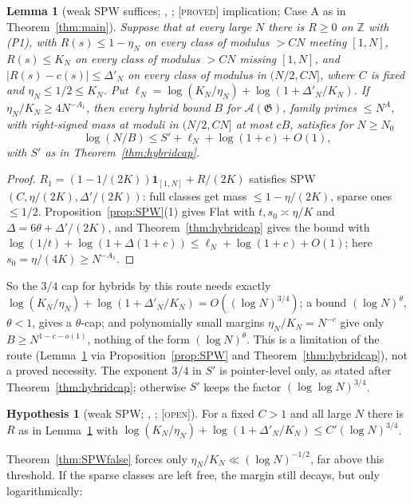 \documentclass[10pt,reqno]{amsart}
\newtheorem{lemma}[theorem]{Lemma}
\theoremstyle{definition}
\newtheorem{hypothesis}[theorem]{Hypothesis}
\theoremstyle{remark}
\newcommand{\A}{\mathcal A}
\newcommand{\cG}{\mathfrak G}
\newcommand{\Z}{\mathbb Z}
\newcommand{\ind}{\mathbf 1}
\newcommand{\lab}[1]{\textup{[\textsc{#1}]}}
\begin{document}
\begin{lemma}[weak SPW suffices; {\cite[Lemma~1.4]{SPW}}, {\cite[Lemma~1.1]{SPW2}}; \lab{proved} implication; Case A as in Theorem~\ref{thm:main}]\label{lem:weakSPW}
Suppose that at every large $N$ there is $R\geq0$ on $\Z$ with (P1), with
$R(s)\leq1-\eta_N$ on every class of modulus $>CN$ meeting $[1,N]$, $R(s)\leq K_N$ on
every class of modulus $>CN$ missing $[1,N]$, and $|R(s)-c(s)|\leq\Delta'_N$ on every
class of modulus in $(N/2,CN]$, where $C$ is fixed and $\eta_N\leq1/2\leq K_N$.  Put
$\ell_N=\log(K_N/\eta_N)+\log(1+\Delta'_N/K_N)$.  If $\eta_N/K_N\geq4N^{-A_1}$, then every
hybrid bound $B$ for $\A(\cG)$, family primes $\leq N^A$, with right-signed mass at
moduli in $(N/2,CN]$ at most $cB$, satisfies for $N\geq N_0$
\[
 \log(N/B)\leq S'+\ell_N+\log(1+c)+O(1),
\]
with $S'$ as in Theorem~\ref{thm:hybridcap}.
\end{lemma}
\begin{proof}
$R_1=(1-1/(2K))\ind_{[1,N]}+R/(2K)$ satisfies SPW$(C,\eta/(2K),\Delta'/(2K))$: full
classes get mass $\leq1-\eta/(2K)$, sparse ones $\leq1/2$.  Proposition~\ref{prop:SPW}(1)
gives Flat with $t,s_0\asymp\eta/K$ and $\Delta=6\theta+\Delta'/(2K)$, and
Theorem~\ref{thm:hybridcap} gives the bound with
$\log(1/t)+\log(1+\Delta(1+c))\leq\ell_N+\log(1+c)+O(1)$; here $s_0=\eta/(4K)\geq N^{-A_1}$.
\end{proof}
So the $3/4$ cap for hybrids by this route needs exactly
$\log(K_N/\eta_N)+\log(1+\Delta'_N/K_N)=O((\log N)^{3/4})$; a bound $(\log N)^\theta$, $\theta<1$,
gives a $\theta$-cap; and polynomially small margins $\eta_N/K_N=N^{-c}$ give only
$B\geq N^{1-c-o(1)}$, nothing of the form $(\log N)^\theta$.  This is a limitation of
the route (Lemma~\ref{lem:weakSPW} via Proposition~\ref{prop:SPW} and
Theorem~\ref{thm:hybridcap}), not a proved necessity.  The exponent $3/4$ in $S'$
is pointer-level only, as stated after Theorem~\ref{thm:hybridcap}; otherwise
$S'$ keeps the factor $(\log\log N)^{3/4}$.

\begin{hypothesis}[weak SPW; {\cite[Lemma~1.4]{SPW}}, {\cite[\S1]{SPW2}}; \lab{open}]\label{hyp:weakSPW}
For a fixed $C>1$ and all large $N$ there is $R$ as in Lemma~\ref{lem:weakSPW} with
$\log(K_N/\eta_N)+\log(1+\Delta'_N/K_N)\leq C'(\log N)^{3/4}$.
\end{hypothesis}
Theorem~\ref{thm:SPWfalse} forces only $\eta_N/K_N\ll(\log N)^{-1/2}$, far above this
threshold.  If the sparse classes are left free, the margin still decays,
but only logarithmically:
\end{document}
